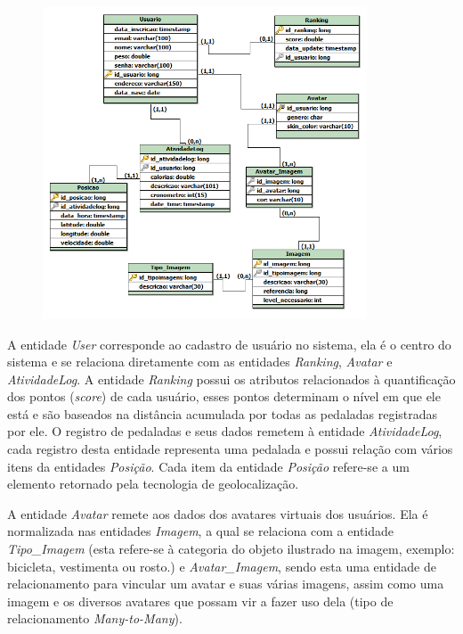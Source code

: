 \begin{figure}
\begin{minipage}{1.0\textwidth}
    \centerline{\includegraphics[width=26em]{figuras/er.png}}
    \label{fig:ermodel}
\end{minipage}
\end{figure}

A entidade \textit{User} corresponde ao cadastro de usuário no sistema, ela é o centro do sistema e se relaciona diretamente com as entidades \textit{Ranking}, \textit{Avatar} e \textit{AtividadeLog}. A entidade \textit{Ranking} possui os atributos relacionados à quantificação dos pontos (\textit{score}) de cada usuário, esses pontos determinam o nível em que ele está e são baseados na distância acumulada por todas as pedaladas registradas por ele. O registro de pedaladas e seus dados remetem à entidade \textit{AtividadeLog}, cada registro desta entidade representa uma pedalada e possui relação com vários itens da entidades \textit{Posição}. Cada item da entidade \textit{Posição} refere-se a um elemento retornado pela tecnologia de geolocalização.
\par
A entidade \textit{Avatar} remete aos dados dos avatares virtuais dos usuários. Ela é normalizada nas entidades \textit{Imagem}, a qual se relaciona com a entidade \textit{Tipo\_Imagem} (esta refere-se à categoria do objeto ilustrado na imagem, exemplo: bicicleta, vestimenta ou rosto.) e \textit{Avatar\_Imagem}, sendo esta uma entidade de relacionamento para vincular um avatar e suas várias imagens, assim como uma imagem e os diversos avatares que possam vir a fazer uso dela (tipo de relacionamento \textit{Many-to-Many}).  


